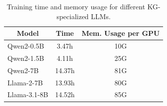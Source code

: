 \begin{table}[]
    \centering
    \caption{Training time and memory usage for different KG-specialized LLMs. }
    \label{tab:training}
    \begin{tabular}{@{}lcc@{}}
    \toprule
    \multicolumn{1}{c}{Model} & Time   & Mem. Usage per GPU \\ \midrule
    Qwen2-0.5B                & 3.47h  & 10G            \\
    Qwen2-1.5B                & 4.11h  & 25G            \\
    Qwen2-7B                  & 14.37h & 81G            \\
    Llama-2-7B                & 13.93h & 80G            \\
    Llama-3.1-8B               & 14.52h & 85G            \\ \bottomrule
    \end{tabular}%
\end{table}